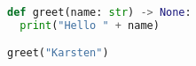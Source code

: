 \begin{lstlisting}[language=Python, caption=<caption>, label=lst:<label>]
def greet(name: str) -> None:
  print("Hello " + name)

greet("Karsten")
\end{lstlisting}
